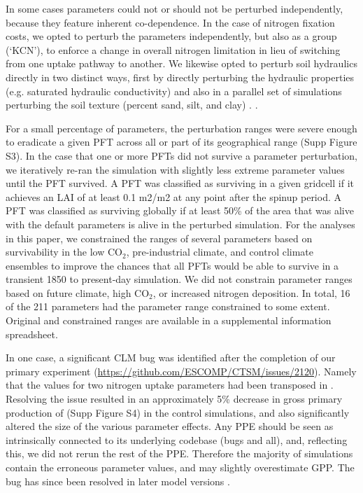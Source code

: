 \documentclass[draft]{agujournal2019}
\begin{document}
In some cases parameters could not or should not be perturbed independently, because they feature inherent co-dependence. In the case of nitrogen fixation costs, we opted to perturb the parameters independently, but also as a group (`KCN'), to enforce a change in overall nitrogen limitation in lieu of switching from one uptake pathway to another.  We likewise opted to perturb soil hydraulics directly in two distinct ways, first by directly perturbing the hydraulic properties (e.g. saturated hydraulic conductivity) and also  in a parallel set of simulations perturbing the soil texture (percent sand, silt, and clay) .
 \cite{migliavacca2021}.


For a small percentage of parameters, the perturbation ranges were severe enough to eradicate a given PFT across all or part of its geographical range (Supp Figure S3). In the case that one or more PFTs did not survive a parameter perturbation, we iteratively re-ran the simulation with slightly less extreme parameter values until the PFT survived. A PFT was classified as surviving in a given gridcell if it achieves an LAI of at least 0.1 m2/m2 at any point after the spinup period. A PFT was classified as surviving globally if at least 50\% of the area that
was alive with the default parameters is alive in the perturbed simulation. For the analyses in this paper, we constrained the ranges of several parameters based on survivability in the low CO$_2$, pre-industrial climate, and control climate ensembles to improve the chances that all PFTs would be able to survive in a transient 1850 to present-day simulation. We did not constrain parameter ranges based on future climate, high CO$_2
$, or increased nitrogen deposition. In total, 16 of the 211 parameters had the parameter range constrained to some extent. Original and constrained ranges are available in a supplemental information spreadsheet.

In one case, a significant CLM bug was identified after the completion of our primary experiment (\url{https://github.com/ESCOMP/CTSM/issues/2120}). Namely that the values for two nitrogen uptake parameters had been transposed in . Resolving the issue resulted in an approximately 5\% decrease in gross primary production of (Supp Figure S4) in the control simulations, and also significantly altered the size of the various parameter effects. Any PPE should be seen as intrinsically connected to its underlying codebase (bugs and all), and, reflecting this, we did not rerun the rest of the PPE. Therefore the majority of simulations contain the erroneous parameter values, and may slightly overestimate GPP.  The bug has since been resolved in later model versions .
\end{document}
